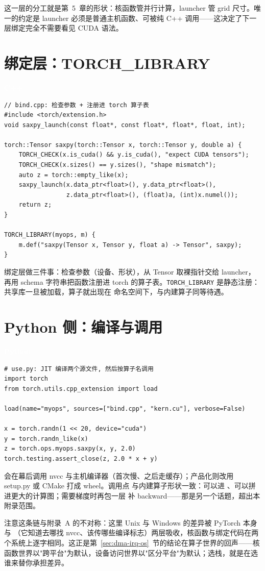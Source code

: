 \documentclass[12pt,a4paper,fontset=fandol]{ctexbook}
\newcommand{\cpplabel}{%
  \begin{tcolorbox}[enhanced,colback=cppheadbg,colframe=cppheadbg,
    arc=1mm,boxrule=0mm,left=6pt,right=6pt,top=2pt,bottom=2pt,
    halign=left,oversize]
    \textcolor{white}{\small\bfseries C++}
  \end{tcolorbox}\vspace{-4pt}}
\newcommand{\pylabel}{%
  \begin{tcolorbox}[enhanced,colback=pyheadbg,colframe=pyheadbg,
    arc=1mm,boxrule=0mm,left=6pt,right=6pt,top=2pt,bottom=2pt,
    halign=left,oversize]
    \textcolor{white}{\small\bfseries Python}
  \end{tcolorbox}\vspace{-4pt}}
\begin{document}
这一层的分工就是第~5~章的形状：核函数管并行计算，launcher 管 grid 尺寸。唯一的约定是 launcher 必须是普通主机函数、可被纯 C++ 调用——这决定了下一层绑定完全不需要看见 CUDA 语法。

\section{绑定层：TORCH\_LIBRARY}

\cpplabel
\begin{lstlisting}[style=cppstyle]
// bind.cpp: 检查参数 + 注册进 torch 算子表
#include <torch/extension.h>
void saxpy_launch(const float*, const float*, float*, float, int);

torch::Tensor saxpy(torch::Tensor x, torch::Tensor y, double a) {
    TORCH_CHECK(x.is_cuda() && y.is_cuda(), "expect CUDA tensors");
    TORCH_CHECK(x.sizes() == y.sizes(), "shape mismatch");
    auto z = torch::empty_like(x);
    saxpy_launch(x.data_ptr<float>(), y.data_ptr<float>(),
                 z.data_ptr<float>(), (float)a, (int)x.numel());
    return z;
}

TORCH_LIBRARY(myops, m) {
    m.def("saxpy(Tensor x, Tensor y, float a) -> Tensor", saxpy);
}
\end{lstlisting}

绑定层做三件事：检查参数（设备、形状），从 Tensor 取裸指针交给 launcher，再用 schema 字符串把函数注册进 torch 的算子表。\texttt{TORCH\_LIBRARY} 是静态注册：共享库一旦被加载，算子就出现在  命名空间下，与内建算子同等待遇。

\section{Python 侧：编译与调用}

\pylabel
\begin{lstlisting}[style=pystyle]
# use.py: JIT 编译两个源文件, 然后按算子名调用
import torch
from torch.utils.cpp_extension import load

load(name="myops", sources=["bind.cpp", "kern.cu"], verbose=False)

x = torch.randn(1 << 20, device="cuda")
y = torch.randn_like(x)
z = torch.ops.myops.saxpy(x, y, 2.0)
torch.testing.assert_close(z, 2.0 * x + y)
\end{lstlisting}

 会在幕后调用 nvcc 与主机编译器（首次慢、之后走缓存）；产品化则改用 setup.py 或 CMake 打成 wheel。调用点  与内建算子形状一致：可以进 、可以拼进更大的计算图；需要梯度时再包一层  补 backward——那是另一个话题，超出本附录范围。

\begin{tcolorbox}[note={OS 差异在这一链里被谁吸收}]
注意这条链与附录~A 的不对称：这里 Unix 与 Windows 的差异被 PyTorch 本身与 （它知道去哪找 nvcc、该传哪些编译标志）两层吸收，核函数与绑定代码在两个系统上逐字相同。这正是第~\ref{sec:dma-irq-os}~节的结论在算子世界的回声——核函数世界以"跨平台"为默认，设备访问世界以"区分平台"为默认；选栈，就是在选谁来替你承担差异。
\end{tcolorbox}
\end{document}
